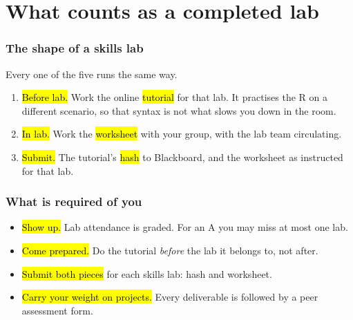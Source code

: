 \documentclass[slidestop,compress,mathserif]{beamer}
\begin{document}
\section{What counts as a completed lab}
\begin{frame}
\frametitle{The shape of a skills lab}

Every one of the five runs the same way.

\begin{enumerate}
  \item \hl{Before lab.} Work the online \hl{tutorial} for that lab.
        It practises the R on a different scenario, so that syntax is not
        what slows you down in the room.
  \item \hl{In lab.} Work the \hl{worksheet} with your group, with the
        lab team circulating.
  \item \hl{Submit.} The tutorial's \hl{hash} to Blackboard, and the
        worksheet as instructed for that lab.
\end{enumerate}


\end{frame}
\begin{frame}
\frametitle{What is required of you}

\begin{itemize}
  \item \hl{Show up.} Lab attendance is graded. For an A you may miss
        at most one lab.
  \item \hl{Come prepared.} Do the tutorial \emph{before} the lab it
        belongs to, not after.
  \item \hl{Submit both pieces} for each skills lab: hash and worksheet.
  \item \hl{Carry your weight on projects.} Every deliverable is
        followed by a peer assessment form.
\end{itemize}


\end{frame}
\end{document}
